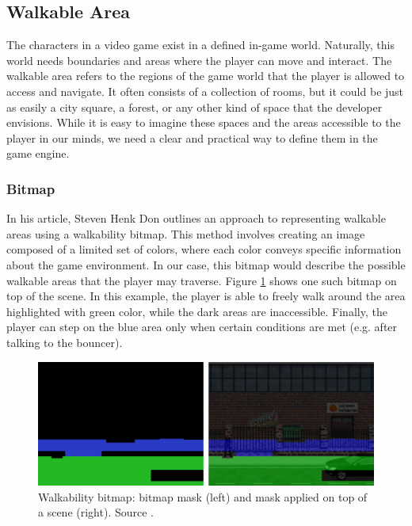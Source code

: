\subsection{Walkable Area}
\label{analysis:walkableMap}

The characters in a video game exist in a defined in-game world. Naturally, this world needs boundaries and areas where the player can move and interact. The walkable area refers to the regions of the game world that the player is allowed to access and navigate. It often consists of a collection of rooms, but it could be just as easily a city square, a forest, or any other kind of space that the developer envisions. While it is easy to imagine these spaces and the areas accessible to the player in our minds, we need a clear and practical way to define them in the game engine. 

\subsubsection{Bitmap}
In his article, Steven Henk Don \cite{Shdon} outlines an approach to representing walkable areas using a walkability bitmap. This method involves creating an image composed of a limited set of colors, where each color conveys specific information about the game environment. In our case, this bitmap would describe the possible walkable areas that the player may traverse. Figure \ref{fig:WS:Bitmap} shows one such bitmap on top of the scene. In this example, the player is able to freely walk around the area highlighted with green color, while the dark areas are inaccessible. Finally, the player can step on the blue area only when certain conditions are met (e.g. after talking to the bouncer).  

\begin{figure}[H]
\centering
\includegraphics[width=1.0\linewidth]{img/walkability-map2.png}
\caption{Walkability bitmap: bitmap mask (left) and mask applied on top of a scene (right). Source \cite{Shdon}.}
\label{fig:WS:Bitmap}
\end{figure}

